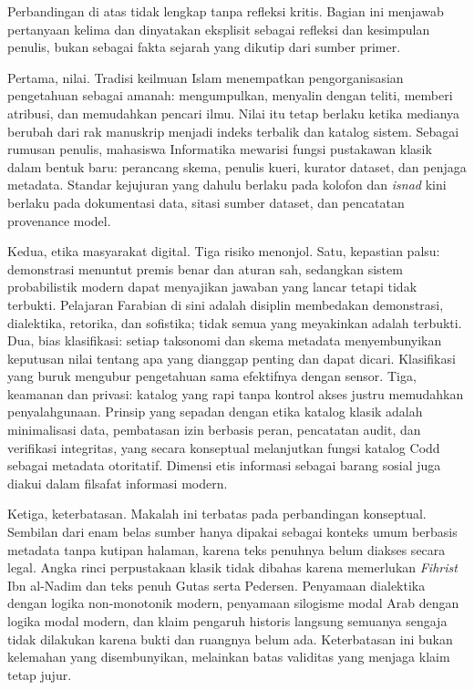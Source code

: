 \documentclass[12pt,a4paper]{article}
\begin{document}
Perbandingan di atas tidak lengkap tanpa refleksi kritis. Bagian ini menjawab pertanyaan kelima dan dinyatakan eksplisit sebagai refleksi dan kesimpulan penulis, bukan sebagai fakta sejarah yang dikutip dari sumber primer.

Pertama, nilai. Tradisi keilmuan Islam menempatkan pengorganisasian pengetahuan sebagai amanah: mengumpulkan, menyalin dengan teliti, memberi atribusi, dan memudahkan pencari ilmu. Nilai itu tetap berlaku ketika medianya berubah dari rak manuskrip menjadi indeks terbalik dan katalog sistem. Sebagai rumusan penulis, mahasiswa Informatika mewarisi fungsi pustakawan klasik dalam bentuk baru: perancang skema, penulis kueri, kurator dataset, dan penjaga metadata. Standar kejujuran yang dahulu berlaku pada kolofon dan \emph{isnad} kini berlaku pada dokumentasi data, sitasi sumber dataset, dan pencatatan provenance model.

Kedua, etika masyarakat digital. Tiga risiko menonjol. Satu, kepastian palsu: demonstrasi menuntut premis benar dan aturan sah, sedangkan sistem probabilistik modern dapat menyajikan jawaban yang lancar tetapi tidak terbukti. Pelajaran Farabian di sini adalah disiplin membedakan demonstrasi, dialektika, retorika, dan sofistika; tidak semua yang meyakinkan adalah terbukti.\autocite{hodges-druart2019}\autocite{black1990} Dua, bias klasifikasi: setiap taksonomi dan skema metadata menyembunyikan keputusan nilai tentang apa yang dianggap penting dan dapat dicari. Klasifikasi yang buruk mengubur pengetahuan sama efektifnya dengan sensor. Tiga, keamanan dan privasi: katalog yang rapi tanpa kontrol akses justru memudahkan penyalahgunaan. Prinsip yang sepadan dengan etika katalog klasik adalah minimalisasi data, pembatasan izin berbasis peran, pencatatan audit, dan verifikasi integritas, yang secara konseptual melanjutkan fungsi katalog Codd sebagai metadata otoritatif.\autocite[381]{codd1970} Dimensi etis informasi sebagai barang sosial juga diakui dalam filsafat informasi modern.\autocite{adriaans2023}

Ketiga, keterbatasan. Makalah ini terbatas pada perbandingan konseptual. Sembilan dari enam belas sumber hanya dipakai sebagai konteks umum berbasis metadata tanpa kutipan halaman, karena teks penuhnya belum diakses secara legal. Angka rinci perpustakaan klasik tidak dibahas karena memerlukan \emph{Fihrist} Ibn al-Nadim dan teks penuh Gutas serta Pedersen. Penyamaan dialektika dengan logika non-monotonik modern, penyamaan silogisme modal Arab dengan logika modal modern, dan klaim pengaruh historis langsung semuanya sengaja tidak dilakukan karena bukti dan ruangnya belum ada. Keterbatasan ini bukan kelemahan yang disembunyikan, melainkan batas validitas yang menjaga klaim tetap jujur.
\end{document}
